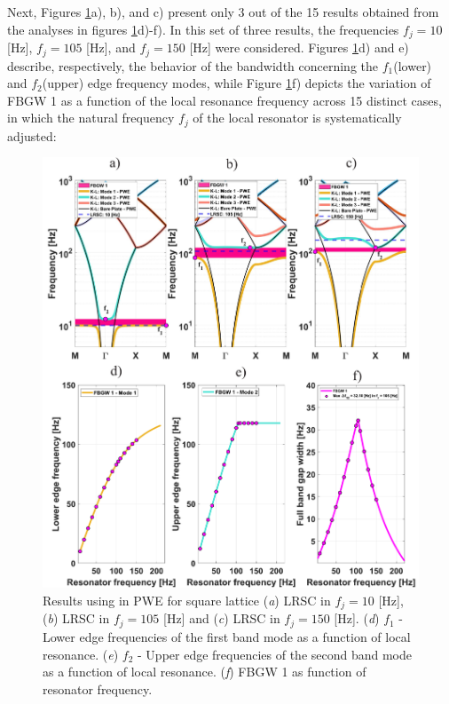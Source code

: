 \documentclass[review,numbers,sort&compress]{elsarticle}
\begin{document}
Next, Figures \ref{pwe_disp_square_all_res}a), b), and c) present only 3 out of the 15 results obtained from the analyses in figures \ref{pwe_disp_square_all_res}d)-f). In this set of three results, the frequencies $f_j = 10$ [Hz], $f_j = 105$ [Hz], and $f_j = 150$ [Hz] were considered. Figures \ref{pwe_disp_square_all_res}d) and e) describe, respectively, the behavior of the bandwidth concerning the $f_1$(lower) and $f_2$(upper) edge frequency modes, while Figure \ref{pwe_disp_square_all_res}f) depicts the variation of FBGW 1 as a function of the local resonance frequency across 15 distinct cases, in which the natural frequency $f_j$ of the local resonator is systematically adjusted:
\newpage
\begin{figure}[htb]
	\centering
	\includegraphics[width=.9\textwidth]{2_1_disp_frf_square.pdf}
	\caption{Results using in PWE for square lattice (\textit{a}) LRSC in $f_j=10$ [Hz], (\textit{b}) LRSC in $f_j=105$ [Hz] and (\textit{c}) LRSC in $f_j=150$ [Hz]. (\textit{d}) $f_1$ - Lower edge frequencies of the first band mode as a function of local resonance. (\textit{e}) $f_2$ - Upper edge frequencies of the second band mode as a function of local resonance. (\textit{f}) FBGW 1 as function of resonator frequency.}
	\label{pwe_disp_square_all_res}
\end{figure}
\end{document}
